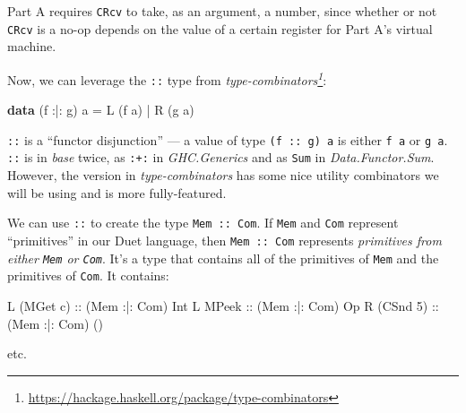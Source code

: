 \documentclass[]{article}
\newenvironment{Shaded}{}{}
\newcommand{\CharTok}[1]{\textcolor[rgb]{0.25,0.44,0.63}{#1}}
\newcommand{\DataTypeTok}[1]{\textcolor[rgb]{0.56,0.13,0.00}{#1}}
\newcommand{\DecValTok}[1]{\textcolor[rgb]{0.25,0.63,0.44}{#1}}
\newcommand{\KeywordTok}[1]{\textcolor[rgb]{0.00,0.44,0.13}{\textbf{#1}}}
\newcommand{\NormalTok}[1]{#1}
\newcommand{\OperatorTok}[1]{\textcolor[rgb]{0.40,0.40,0.40}{#1}}
\newcommand{\OtherTok}[1]{\textcolor[rgb]{0.00,0.44,0.13}{#1}}
\renewcommand{\href}[2]{#2\footnote{\url{#1}}}
\begin{document}
Part A requires \texttt{CRcv} to take, as an argument, a number, since whether
or not \texttt{CRcv} is a no-op depends on the value of a certain register for
Part A's virtual machine.

Now, we can leverage the \texttt{:\textbar{}:} type from
\emph{\href{https://hackage.haskell.org/package/type-combinators}{type-combinators}}:

\begin{Shaded}
\begin{Highlighting}[]
\KeywordTok{data}\NormalTok{ (f }\OperatorTok{:|:}\NormalTok{ g) a }\OtherTok{=} \DataTypeTok{L}\NormalTok{ (f a)}
                 \OperatorTok{|} \DataTypeTok{R}\NormalTok{ (g a)}
\end{Highlighting}
\end{Shaded}

\texttt{:\textbar{}:} is a ``functor disjunction'' --- a value of type
\texttt{(f\ :\textbar{}:\ g)\ a} is either \texttt{f\ a} or \texttt{g\ a}.
\texttt{:\textbar{}:} is in \emph{base} twice, as \texttt{:+:} in
\emph{GHC.Generics} and as \texttt{Sum} in \emph{Data.Functor.Sum}. However, the
version in \emph{type-combinators} has some nice utility combinators we will be
using and is more fully-featured.

We can use \texttt{:\textbar{}:} to create the type
\texttt{Mem\ :\textbar{}:\ Com}. If \texttt{Mem} and \texttt{Com} represent
``primitives'' in our Duet language, then \texttt{Mem\ :\textbar{}:\ Com}
represents \emph{primitives from either \texttt{Mem} or \texttt{Com}}. It's a
type that contains all of the primitives of \texttt{Mem} and the primitives of
\texttt{Com}. It contains:

\begin{Shaded}
\begin{Highlighting}[]
\DataTypeTok{L}\NormalTok{ (}\DataTypeTok{MGet} \CharTok{\textquotesingle{}c\textquotesingle{}}\NormalTok{)}\OtherTok{ ::}\NormalTok{ (}\DataTypeTok{Mem} \OperatorTok{:|:} \DataTypeTok{Com}\NormalTok{) }\DataTypeTok{Int}
\DataTypeTok{L} \DataTypeTok{MPeek}\OtherTok{      ::}\NormalTok{ (}\DataTypeTok{Mem} \OperatorTok{:|:} \DataTypeTok{Com}\NormalTok{) }\DataTypeTok{Op}
\DataTypeTok{R}\NormalTok{ (}\DataTypeTok{CSnd} \DecValTok{5}\NormalTok{)}\OtherTok{   ::}\NormalTok{ (}\DataTypeTok{Mem} \OperatorTok{:|:} \DataTypeTok{Com}\NormalTok{) ()}
\end{Highlighting}
\end{Shaded}

etc.
\end{document}
